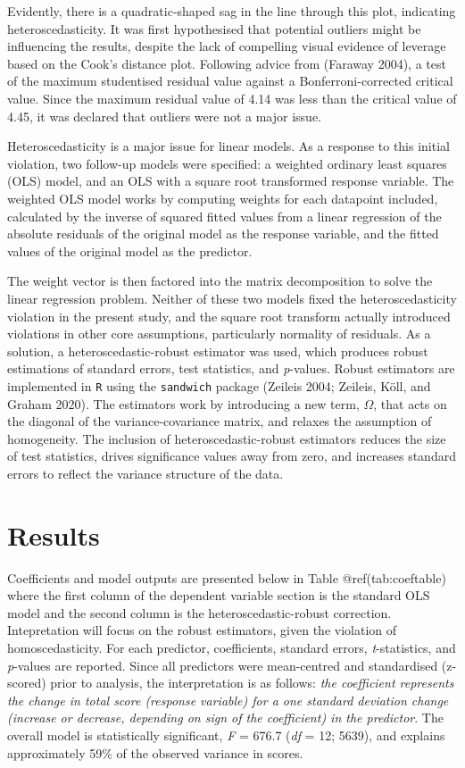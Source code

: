 \documentclass{article}
\begin{document}
Evidently, there is a quadratic-shaped sag in the line through this
plot, indicating heteroscedasticity. It was first hypothesised that
potential outliers might be influencing the results, despite the lack of
compelling visual evidence of leverage based on the Cook's distance
plot. Following advice from (Faraway 2004), a test of the maximum
studentised residual value against a Bonferroni-corrected critical
value. Since the maximum residual value of 4.14 was less than the
critical value of 4.45, it was declared that outliers were not a major
issue.

Heteroscedasticity is a major issue for linear models. As a response to
this initial violation, two follow-up models were specified: a weighted
ordinary least squares (OLS) model, and an OLS with a square root
transformed response variable. The weighted OLS model works by computing
weights for each datapoint included, calculated by the inverse of
squared fitted values from a linear regression of the absolute residuals
of the original model as the response variable, and the fitted values of
the original model as the predictor.

The weight vector is then factored into the matrix decomposition to
solve the linear regression problem. Neither of these two models fixed
the heteroscedasticity violation in the present study, and the square
root transform actually introduced violations in other core assumptions,
particularly normality of residuals. As a solution, a
heteroscedastic-robust estimator was used, which produces robust
estimations of standard errors, test statistics, and \emph{p}-values.
Robust estimators are implemented in \texttt{R} using the
\texttt{sandwich} package (Zeileis 2004; Zeileis, Köll, and Graham
2020). The estimators work by introducing a new term, \(\Omega\), that
acts on the diagonal of the variance-covariance matrix, and relaxes the
assumption of homogeneity. The inclusion of heteroscedastic-robust
estimators reduces the size of test statistics, drives significance
values away from zero, and increases standard errors to reflect the
variance structure of the data.

\hypertarget{results}{%
\section{Results}\label{results}}

Coefficients and model outputs are presented below in Table
@ref(tab:coeftable) where the first column of the dependent variable
section is the standard OLS model and the second column is the
heteroscedastic-robust correction. Intepretation will focus on the
robust estimators, given the violation of homoscedasticity. For each
predictor, coefficients, standard errors, \emph{t}-statistics, and
\emph{p}-values are reported. Since all predictors were mean-centred and
standardised (z-scored) prior to analysis, the interpretation is as
follows: \emph{the coefficient represents the change in total score
(response variable) for a one standard deviation change (increase or
decrease, depending on sign of the coefficient) in the predictor}. The
overall model is statistically significant, \emph{F} = 676.7 (\emph{df}
= 12; 5639), and explains approximately 59\% of the observed variance in
scores.
\end{document}
